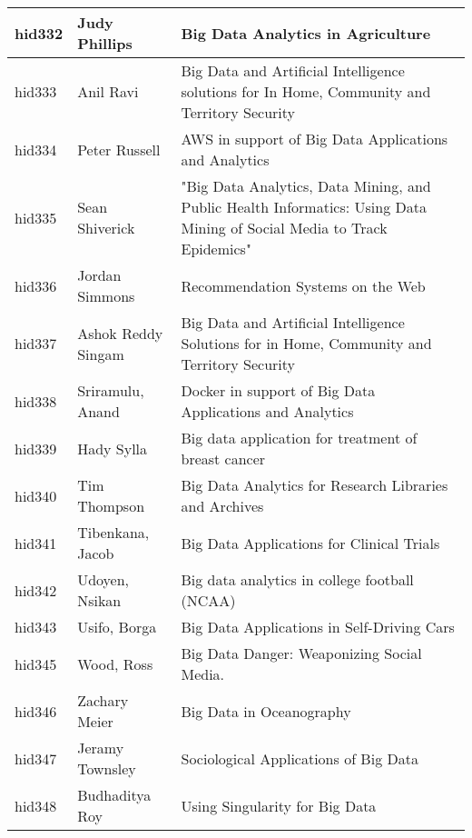 \documentclass[12pt]{book}
\begin{document}
\begin{footnotesize}
\begin{longtable}{|p{1cm}p{5cm}p{9cm}|}
\hline
hid332 & Judy Phillips & Big Data Analytics in Agriculture  \\
\hline
hid333 & Anil Ravi & Big Data and Artificial Intelligence solutions for In Home, Community and Territory Security  \\
\hline
hid334 & Peter Russell & AWS in support of Big Data Applications and Analytics  \\
\hline
hid335 & Sean Shiverick & "Big Data Analytics, Data Mining, and Public Health Informatics:  Using Data Mining of Social Media to Track Epidemics"
  \\
\hline
hid336 & Jordan Simmons & Recommendation Systems on the Web  \\
\hline
hid337 & Ashok Reddy Singam & Big Data and Artificial Intelligence Solutions for in Home, Community and Territory Security  \\
\hline
hid338 & Sriramulu, Anand & Docker in support of Big Data Applications and Analytics  \\
\hline
hid339 & Hady Sylla & Big data application for treatment of breast cancer  \\
\hline
hid340 & Tim Thompson & Big Data Analytics for Research Libraries and Archives  \\
\hline
hid341 & Tibenkana, Jacob & Big Data Applications for Clinical Trials  \\
\hline
hid342 & Udoyen, Nsikan & Big data analytics in college football (NCAA)  \\
\hline
hid343 & Usifo, Borga & Big Data Applications in Self-Driving Cars  \\
\hline
hid345 & Wood, Ross & Big Data Danger: Weaponizing Social Media.  \\
\hline
hid346 & Zachary Meier & Big Data in Oceanography  \\
\hline
hid347 & Jeramy Townsley & Sociological Applications of Big Data  \\
\hline
hid348 & Budhaditya Roy & Using Singularity for Big Data  \\
\hline
\end{longtable}
\end{footnotesize}
\newpage
\end{document}
